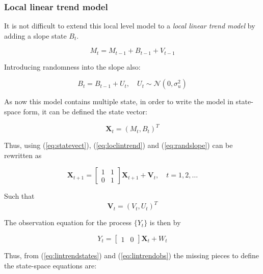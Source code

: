 \subsubsection{Local linear trend model}

It is not difficult to extend this local level model to a \emph{local linear trend model} by adding a slope state $B_t$. 

\begin{equation}
	M_t = M_{t-1} + B_{t-1} + V_{t-1} \label{eq:loclintrend}
\end{equation}

Introducing randomness into the slope also:

\begin{equation}
	B_t = B_{t-1} + U_t , \quad  U_t \sim \mathcal{N}(0,\sigma^2_u) \label{eq:randslope}
\end{equation} 

As now this model contains multiple state, in order to write the model in state-space form, it can be defined the state vector:

\begin{equation}
	\bm{X}_t = (M_t, B_t)^T \label{eq:statevect}
\end{equation}

Thus, using (\ref{eq:statevect}), (\ref{eq:loclintrend}) and (\ref{eq:randslope}) can be rewritten as

\begin{equation}
	\bm{X}_{t+1} = 
	\begin{bmatrix}
		1 & 1 \\
		0 & 1 
	\end{bmatrix} \bm{X}_{t+1} + \bm{V}_{t}, \quad t = 1, 2, \ldots
	\label{eq:lintrendstates}
\end{equation}

Such that 
\begin{equation}\label{eq:V_trend}
	\bm{V}_{t} = (V_t, U_t)^T
\end{equation}

The observation equation for the process $\{Y_t\}$ is then by

\begin{equation}\label{eq:lintrendobs}
	Y_t = \begin{bmatrix}1 & 0\end{bmatrix}\bm{X}_{t} + W_t
\end{equation}

Thus, from (\ref{eq:lintrendstates}) and (\ref{eq:lintrendobs}) the missing pieces to define the state-space equations are:

